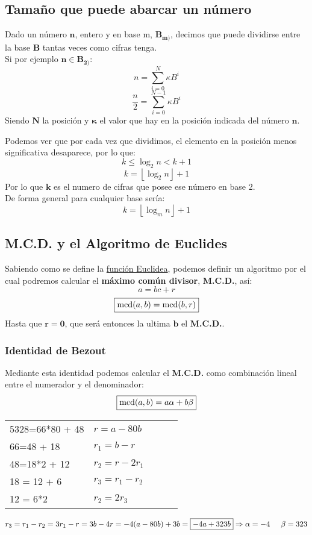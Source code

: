 \subsection{Tamaño que puede abarcar un número}
\noindent Dado un número \(\mathbf{n}\), entero y en base m, \(\mathbf{B_{m)}}\), decimos que puede dividirse entre la base \(\mathbf{B}\) tantas veces como cifras tenga.\\
Si por ejemplo \(\mathbf{n \in B_{2)}}\):
\[
        n = \sum^N_{i = 0} \kappa B^i
\]
\[
        \frac{n}{2} = \sum^{N-1}_{i = 0} \kappa B^i
\]
\noindent Siendo \(\mathbf{N}\) la posición y \(\mathbf{\kappa}\) el valor que hay en la posición indicada del número \(\mathbf{n}\).\par
\noindent Podemos ver que por cada vez que dividimos, el elemento en la posición menos significativa desaparece, por lo que:
\[
        k \leq \log_{2}{n} < k + 1
\]
\[
        k = \left \lfloor \log_{2}n \right \rfloor + 1
\]
Por lo que \(\mathbf{k}\) es el numero de cifras que posee ese número en base 2. \\ De forma general para cualquier base sería:
\[
        \boxed{k = \left \lfloor \log_{m}n \right \rfloor + 1}
\]
\subsection{M.C.D. y el Algoritmo de Euclides}
\noindent Sabiendo como se define la \underline{función Euclidea}, podemos definir un algoritmo por el cual podremos calcular el \textbf{máximo común divisor}, \textbf{M.C.D.}, así:
\[
        a = bc + r
\]
\[
        \boxed{\textnormal{mcd}(a,b) = \textnormal{mcd}(b,r)}
\] \noindent Hasta que \(\mathbf{r = 0}\), que será entonces la ultima \(\mathbf{b}\) el \textbf{M.C.D.}.
\subsubsection{Identidad de Bezout}
\noindent Mediante esta identidad podemos calcular el \textbf{M.C.D.} como combinación lineal entre el numerador y el denominador:
\[
        \boxed{\textnormal{mcd}(a,b) = a\alpha + b\beta}
\]
\begin{table}[h]
        \begin{tabular}{l|llll}
                \cline{1-2}
                5328=66*80 + 48 & \(r = a - 80b\)     &  &  & \\ \cline{1-2}
                66=48 + 18      & \(r_1 = b - r\)     &  &  & \\ \cline{1-2}
                48=18*2 + 12    & \(r_2 = r - 2r_1\)  &  &  & \\ \cline{1-2}
                18 = 12 + 6     & \(r_3 = r_1 - r_2\) &  &  & \\ \cline{1-2}
                12 = 6*2        & \(r_2 = 2r_3\)      &  &  &
        \end{tabular}
\end{table}
\[
        r_3 = r_1 - r_2 = 3r_1 -r = 3b -4r = -4(a - 80b) +3b = \boxed{-4a +323b}\Rightarrow \alpha = -4 \hspace{5mm} \beta = 323
\]
